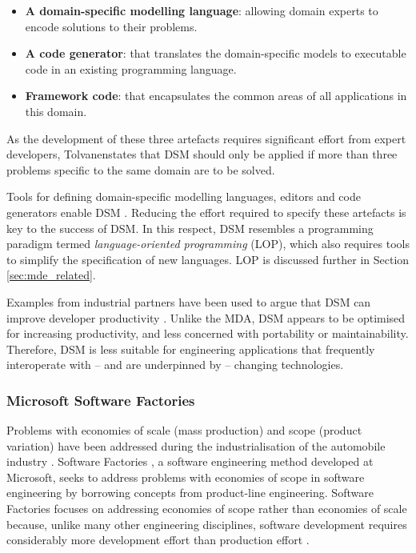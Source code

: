 \begin{itemize}
 \item \textbf{A domain-specific modelling language}: allowing domain experts to encode solutions to their problems.
 \item \textbf{A code generator}: that translates the domain-specific models to executable code in an existing programming language.
 \item \textbf{Framework code}: that encapsulates the common areas of all applications in this domain.
\end{itemize}

As the development of these three artefacts requires significant effort from expert developers, Tolvanen\footnotemark[\value{footnote}] states that DSM should only be applied if more than three problems specific to the same domain are to be solved.

Tools for defining domain-specific modelling languages, editors and code generators enable DSM \cite{kelly08dsm}. Reducing the effort required to specify these artefacts is key to the success of DSM. In this respect, DSM resembles a programming paradigm termed \textit{language-oriented programming} (LOP), which also requires tools to simplify the specification of new languages. LOP is discussed further in Section \ref{sec:mde_related}.

Examples from industrial partners have been used to argue that DSM can improve developer productivity \cite{kelly08dsm}. Unlike the MDA, DSM appears to be optimised for increasing productivity, and less concerned with portability or maintainability. Therefore, DSM is less suitable for engineering applications that frequently interoperate with -- and are underpinned by -- changing technologies.

\subsubsection{Microsoft Software Factories}
Problems with economies of scale (mass production) and scope (product variation) have been addressed during the industrialisation of the automobile industry \cite[pg159]{greenfield04software}. Software Factories \cite{greenfield04software}, a software engineering method developed at Microsoft, seeks to address problems with economies of scope in software engineering by borrowing concepts from product-line engineering. Software Factories focuses on addressing ec\-on\-om\-ies of scope rather than economies of scale because, unlike many other engineering disciplines, software development requires considerably more development effort than production effort \cite{greenfield04software}.

